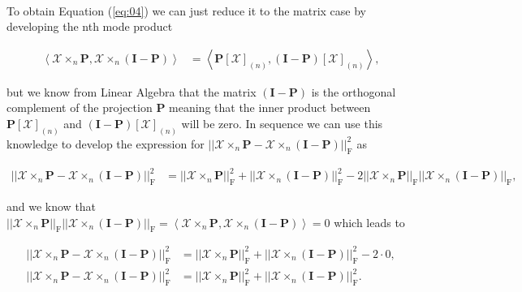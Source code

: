 \documentclass[a4paper,10pt]{article}
\begin{document}
\begin{enumerate}
\begin{enumerate}
                \paragraph{}To obtain Equation (\ref{eq:04}) we can just reduce it to the matrix case by developing the nth mode product
                
                \begin{align}
                    \left< \mathcal{X} \times_{n} \boldsymbol{P}, \mathcal{X} \times_{n} (\boldsymbol{I} - \boldsymbol{P}) \right> &=\left< \boldsymbol{P} \left[\mathcal{X}\right]_{(n)}, (\boldsymbol{I} - \boldsymbol{P}) \left[\mathcal{X}\right]_{(n)} \right>,
                \end{align}
                
                but we know from Linear Algebra that the matrix $(\boldsymbol{I} - \boldsymbol{P})$ is the orthogonal complement of the projection $\boldsymbol{P}$ meaning that the inner product between $\boldsymbol{P} \left[\mathcal{X}\right]_{(n)}$ and $(\boldsymbol{I} - \boldsymbol{P}) \left[\mathcal{X}\right]_{(n)}$ will be zero. In sequence we can use this knowledge to develop the expression for $|| \mathcal{X} \times_{n} \boldsymbol{P} - \mathcal{X} \times_{n} (\boldsymbol{I} - \boldsymbol{P}) ||^{2}_{\text{F}}$ as
                
                \begin{align*}
                    || \mathcal{X} \times_{n} \boldsymbol{P} - \mathcal{X} \times_{n} (\boldsymbol{I} - \boldsymbol{P}) ||^{2}_{\text{F}} &= || \mathcal{X} \times_{n} \boldsymbol{P} ||^{2}_{\text{F}} + ||  \mathcal{X} \times_{n} (\boldsymbol{I} - \boldsymbol{P}) ||^{2}_{\text{F}} -2 ||  \mathcal{X} \times_{n} \boldsymbol{P}  ||_{\text{F}} || \mathcal{X} \times_{n} (\boldsymbol{I} - \boldsymbol{P}) ||_{\text{F}},
                \end{align*}
                
                and we know that $||  \mathcal{X} \times_{n} \boldsymbol{P}  ||_{\text{F}} || \mathcal{X} \times_{n} (\boldsymbol{I} - \boldsymbol{P}) ||_{\text{F}} = \left< \mathcal{X} \times_{n} \boldsymbol{P}, \mathcal{X} \times_{n} (\boldsymbol{I} - \boldsymbol{P}) \right> = 0$ which leads to
                
                \begin{align*}
                    || \mathcal{X} \times_{n} \boldsymbol{P} - \mathcal{X} \times_{n} (\boldsymbol{I} - \boldsymbol{P}) ||^{2}_{\text{F}} &= || \mathcal{X} \times_{n} \boldsymbol{P} ||^{2}_{\text{F}} + || \mathcal{X} \times_{n} (\boldsymbol{I} - \boldsymbol{P}) ||^{2}_{\text{F}} -2 \cdot 0, \\
                    || \mathcal{X} \times_{n} \boldsymbol{P} - \mathcal{X} \times_{n} (\boldsymbol{I} - \boldsymbol{P}) ||^{2}_{\text{F}} &= || \mathcal{X} \times_{n} \boldsymbol{P} ||^{2}_{\text{F}} + || \mathcal{X} \times_{n} (\boldsymbol{I} - \boldsymbol{P}) ||^{2}_{\text{F}}.
                \end{align*}
                

\end{enumerate}
\end{enumerate}
\end{document}
